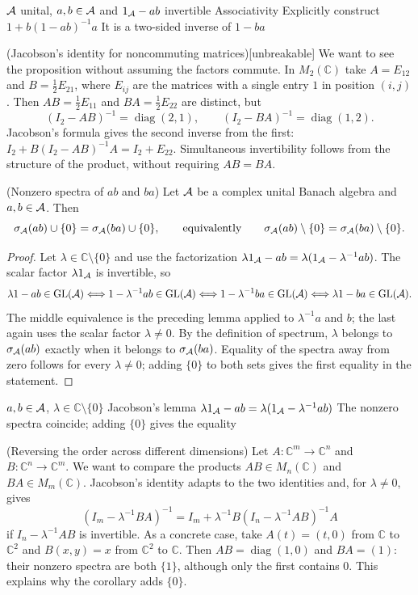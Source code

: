 \proofdiagram
{$\mathcal A$ unital, $a,b\in\mathcal A$ and $1_\mathcal A-ab$ invertible}
{Associativity}
{Explicitly construct $1+b(1-ab)^{-1}a$}
{It is a two-sided inverse of $1-ba$}

\begin{cthejemplo}{(Jacobson's identity for noncommuting matrices)}[unbreakable]
We want to see the proposition without assuming the factors commute.
In $M_2(\mathbb C)$ take $A=E_{12}$ and
$B=\frac12E_{21}$, where $E_{ij}$ are the matrices with a
single entry $1$ in position $(i,j)$. Then
$AB=\frac12E_{11}$ and $BA=\frac12E_{22}$ are distinct, but
\[
 (I_2-AB)^{-1}=\operatorname{diag}(2,1),\qquad
 (I_2-BA)^{-1}=\operatorname{diag}(1,2).
\]
Jacobson's formula gives the second inverse from the first:
$I_2+B(I_2-AB)^{-1}A=I_2+E_{22}$.
Simultaneous invertibility follows from the structure of the product,
without requiring $AB=BA$.
\end{cthejemplo}

\begin{cthcorolario}{(Nonzero spectra of $ab$ and $ba$)}
Let $\mathcal A$ be a complex unital Banach algebra and $a,b\in\mathcal A$.
Then
\[
 \sigma_\mathcal A(ab)\cup\{0\}=\sigma_\mathcal A(ba)\cup\{0\},
 \qquad\text{equivalently}\qquad
 \sigma_\mathcal A(ab)\setminus\{0\}=\sigma_\mathcal A(ba)\setminus\{0\}.
\]
\end{cthcorolario}

\begin{proof}[Proof]
Let $\lambda\in\mathbb C\setminus\{0\}$ and use
the factorization
$\lambda1_\mathcal A-ab=\lambda(1_\mathcal A-\lambda^{-1}ab)$.
The scalar factor $\lambda1_\mathcal A$ is invertible, so
\[
\lambda1-ab\in\operatorname{GL}(\mathcal A)
\Longleftrightarrow
1-\lambda^{-1}ab\in\operatorname{GL}(\mathcal A)
\Longleftrightarrow
1-\lambda^{-1}ba\in\operatorname{GL}(\mathcal A)
\Longleftrightarrow
\lambda1-ba\in\operatorname{GL}(\mathcal A).
\]
The middle equivalence is the preceding lemma applied to
$\lambda^{-1}a$ and $b$; the last again uses the scalar factor
$\lambda\ne0$. By the definition of spectrum, $\lambda$ belongs
to $\sigma_\mathcal A(ab)$ exactly when it belongs to
$\sigma_\mathcal A(ba)$. Equality of the spectra away from zero
follows for every $\lambda\ne0$; adding $\{0\}$ to both
sets gives the first equality in the statement.
\end{proof}

\proofdiagram
{$a,b\in\mathcal A$, $\lambda\in\mathbb C\setminus\{0\}$}
{Jacobson's lemma}
{$\lambda1_\mathcal A-ab=\lambda(1_\mathcal A-\lambda^{-1}ab)$}
{The nonzero spectra coincide; adding $\{0\}$ gives the equality}

\begin{cthejemplo}{(Reversing the order across different dimensions)}
Let $A:\mathbb C^m\to\mathbb C^n$ and
$B:\mathbb C^n\to\mathbb C^m$. We want to compare the products
$AB\in M_n(\mathbb C)$ and $BA\in M_m(\mathbb C)$.
Jacobson's identity adapts to the two identities and, for
$\lambda\ne0$, gives
\[
 (I_m-\lambda^{-1}BA)^{-1}
 =I_m+\lambda^{-1}B(I_n-\lambda^{-1}AB)^{-1}A
\]
 if $I_n-\lambda^{-1}AB$ is invertible. As a concrete case, take
$A(t)=(t,0)$ from $\mathbb C$ to $\mathbb C^2$ and
$B(x,y)=x$ from $\mathbb C^2$ to $\mathbb C$. Then
$AB=\operatorname{diag}(1,0)$ and $BA=(1)$:
their nonzero spectra are both $\{1\}$, although only the first
contains $0$. This explains why the corollary adds $\{0\}$.
\end{cthejemplo}

